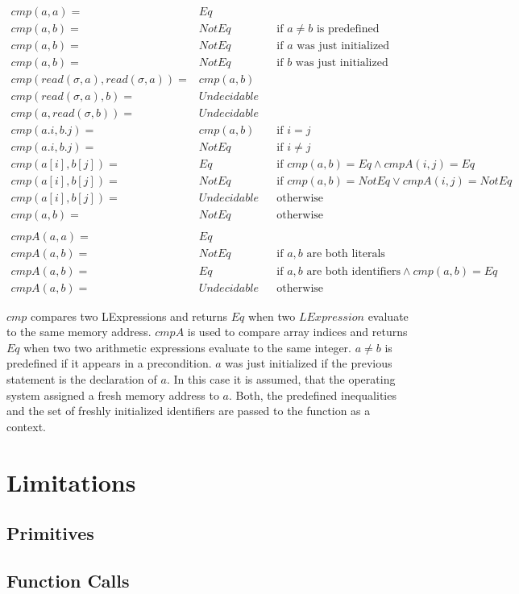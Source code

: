 \documentclass[12pt]{article}
\begin{document}
\begin{align*}
    cmp(a,a)= & Eq\\
    cmp(a,b)= & NotEq &  & \text{if }a\neq b\text{ is predefined}\\
    cmp(a,b)= & NotEq &  & \text{if }a\text{ was just initialized}\\
    cmp(a,b)= & NotEq &  & \text{if }b\text{ was just initialized}\\
    cmp(read(\sigma,a),read(\sigma,a))= & cmp(a,b)\\
    cmp(read(\sigma,a),b)= & Undecidable\\
    cmp(a,read(\sigma,b))= & Undecidable\\
    cmp(a.i,b.j)= & cmp(a,b) &  & \text{if }i=j\\
    cmp(a.i,b.j)= & NotEq &   & \text{if }i\neq j\\
    cmp(a[i],b[j])= & Eq &  & \text{if }cmp(a,b)=Eq\wedge cmpA(i,j)=Eq\\
    cmp(a[i],b[j])= & NotEq &  & \text{if }cmp(a,b)=NotEq\vee cmpA(i,j)=NotEq\\
    cmp(a[i],b[j])= & Undecidable &  & \text{otherwise}\\
    cmp(a,b)= & NotEq &  & \text{otherwise}\\
    \\
    cmpA(a,a)= & Eq\\
    cmpA(a,b)= & NotEq &  & \text{if }a,b\text{ are both literals}\\
    cmpA(a,b)= & Eq &  & \text{if }a,b\text{ are both identifiers}\wedge cmp(a,b)=Eq\\
    cmpA(a,b)= & Undecidable &  & \text{otherwise}
\end{align*}

$cmp$ compares two LExpressions and returns $Eq$ when two $LExpression$ evaluate to the same memory address.
$cmpA$ is used to compare array indices and returns $Eq$ when two two arithmetic expressions evaluate to the same integer.
$a \neq b$ is predefined if it appears in a precondition. 
$a$ was just initialized if the previous statement is the declaration of $a$. 
In this case it is assumed, that the operating system assigned a fresh memory address to $a$.
Both, the predefined inequalities and the set of freshly initialized identifiers are passed to the function as a context.

\section{Limitations}

\subsection{Primitives}
\label{primitives}

\subsection{Function Calls}
\label{funcalls}
\end{document}
